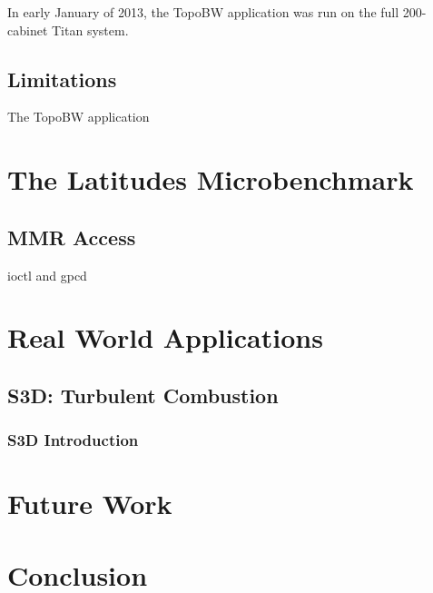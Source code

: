\documentclass[10pt, conference, compsocconf]{IEEEtran}
\begin{document}
In early January of 2013, the TopoBW application was run on the full
200-cabinet Titan system.



\subsection{Limitations}

The TopoBW application 

\section{The Latitudes Microbenchmark}

\subsection{MMR Access}
ioctl and gpcd


\section{Real World Applications}

\subsection{S3D: Turbulent Combustion}

\subsubsection{S3D Introduction}



\section{Future Work}

\section{Conclusion}

\end{document}
